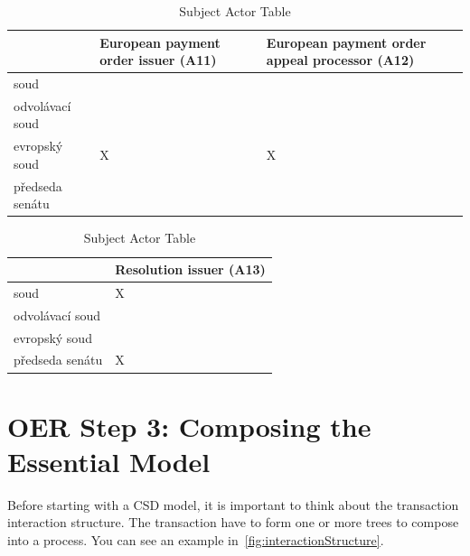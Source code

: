 \begin{landscape}
\begin{table}[h]
\caption{Subject Actor Table}
\label{tab:subjectactortable}
\begin{tabular}{|l|l|l|}
\hline
    &  European payment order issuer  (A11) &   European payment order appeal processor (A12)   \\ \hline
soud &  &    \\ \hline
odvolávací soud &  &   \\ \hline
evropský soud & X & X \\ \hline
předseda senátu &  &    \\ \hline
\end{tabular}
\end{table}

\begin{table}[h]
  \caption{Subject Actor Table}
  \label{tab:subjectactortable}
  \begin{tabular}{|l|l|}
  \hline
   &  Resolution issuer (A13) \\ \hline
soud & X \\ \hline
odvolávací soud & \\ \hline
evropský soud & \\ \hline
předseda senátu & X \\ \hline
\end{tabular}
\end{table}


\end{landscape}

\section{OER Step 3: Composing the Essential Model}

Before starting with a CSD model, it is important to think about the transaction interaction structure. The transaction have to form one or more trees to compose into a process. You can see an example in~\cref{fig:interactionStructure}. 

